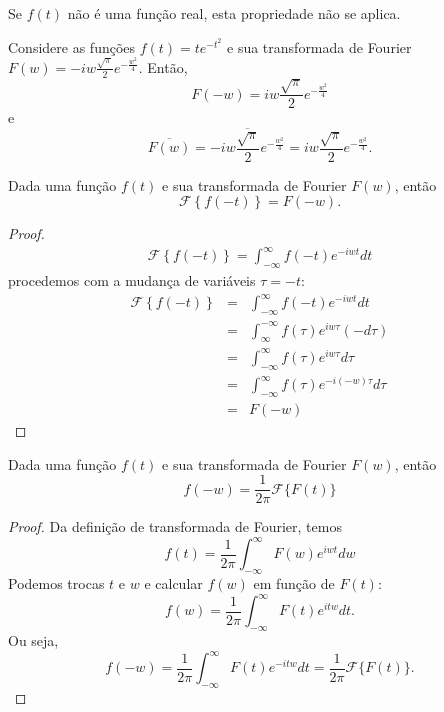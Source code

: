 \begin{obs} Se $f(t)$ não é uma função real, esta propriedade não se aplica.
\end{obs}
\begin{ex}Considere as funções $f(t)=te^{-t^2}$ e sua transformada de Fourier $F(w)=-iw\frac{\sqrt{\pi}}{2}e^{-\frac{w^2}{4}}$. Então,
\begin{equation}
F(-w)=iw\frac{\sqrt{\pi}}{2}e^{-\frac{w^2}{4}}
\end{equation}
e
\begin{equation}
\overline{F(w)}=\overline{-iw\frac{\sqrt{\pi}}{2}e^{-\frac{w^2}{4}}}=iw\frac{\sqrt{\pi}}{2}e^{-\frac{w^2}{4}}.
\end{equation}
\end{ex}
\begin{teo}\label{prop_inv_temp} Dada uma função $f(t)$ e sua transformada de Fourier $F(w)$, então \begin{equation}\mathcal{F}\left\{f(-t)\right\}=F(-w).\end{equation}
\end{teo}
\begin{proof}
\begin{eqnarray*}
\mathcal{F}\left\{f(-t)\right\}=\int_{-\infty}^\infty f(-t) e^{-iwt}dt
\end{eqnarray*}
procedemos com a mudança de variáveis $\tau=-t$:
\begin{eqnarray*}
\mathcal{F}\left\{f(-t)\right\}&=&\int_{-\infty}^\infty f(-t) e^{-iwt}dt\\
&=&\int_{\infty}^{-\infty} f(\tau) e^{iw\tau}(-d\tau) \\
&=&\int_{-\infty}^{\infty} f(\tau) e^{iw\tau}d\tau \\
&=&\int_{-\infty}^{\infty} f(\tau) e^{-i(-w)\tau}d\tau \\
&=&F(-w)
\end{eqnarray*}
\end{proof}
\begin{teo}\label{prop_sim_dua} Dada uma função $f(t)$ e sua transformada de Fourier $F(w)$, então 
\begin{equation}
f(-w)=\frac{1}{2\pi}\mathcal{F}\{F(t)\}
\end{equation}
\end{teo}
\begin{proof} Da definição de transformada de Fourier, temos
\begin{equation}
f(t)=\frac{1}{2\pi}\int_{-\infty}^{\infty} F(w)e^{iwt}dw
\end{equation}
Podemos trocas $t$ e $w$ e calcular $f(w)$ em função de $F(t)$:
\begin{equation}
f(w)=\frac{1}{2\pi}\int_{-\infty}^{\infty} F(t)e^{itw}dt.
\end{equation}
Ou seja, 
\begin{equation}
f(-w)=\frac{1}{2\pi}\int_{-\infty}^{\infty} F(t)e^{-itw}dt=\frac{1}{2\pi}\mathcal{F}\{F(t)\}.
\end{equation}
\end{proof}
